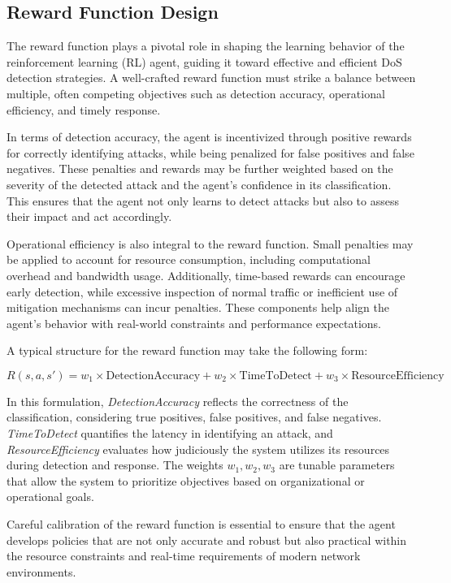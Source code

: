 \documentclass{report}
\begin{document}
\subsection{Reward Function Design}

The reward function plays a pivotal role in shaping the learning behavior of the reinforcement learning (RL) agent, guiding it toward effective and efficient DoS detection strategies. A well-crafted reward function must strike a balance between multiple, often competing objectives such as detection accuracy, operational efficiency, and timely response.

In terms of detection accuracy, the agent is incentivized through positive rewards for correctly identifying attacks, while being penalized for false positives and false negatives. These penalties and rewards may be further weighted based on the severity of the detected attack and the agent’s confidence in its classification. This ensures that the agent not only learns to detect attacks but also to assess their impact and act accordingly.

Operational efficiency is also integral to the reward function. Small penalties may be applied to account for resource consumption, including computational overhead and bandwidth usage. Additionally, time-based rewards can encourage early detection, while excessive inspection of normal traffic or inefficient use of mitigation mechanisms can incur penalties. These components help align the agent’s behavior with real-world constraints and performance expectations.

A typical structure for the reward function may take the following form:

\begin{equation}
R(s, a, s') = w_{1} \times \text{DetectionAccuracy} + w_{2} \times \text{TimeToDetect} + w_{3} \times \text{ResourceEfficiency}
\end{equation}

In this formulation, \textit{DetectionAccuracy} reflects the correctness of the classification, considering true positives, false positives, and false negatives. \textit{TimeToDetect} quantifies the latency in identifying an attack, and \textit{ResourceEfficiency} evaluates how judiciously the system utilizes its resources during detection and response. The weights \(w_{1}, w_{2}, w_{3}\) are tunable parameters that allow the system to prioritize objectives based on organizational or operational goals.

Careful calibration of the reward function is essential to ensure that the agent develops policies that are not only accurate and robust but also practical within the resource constraints and real-time requirements of modern network environments.
\end{document}
